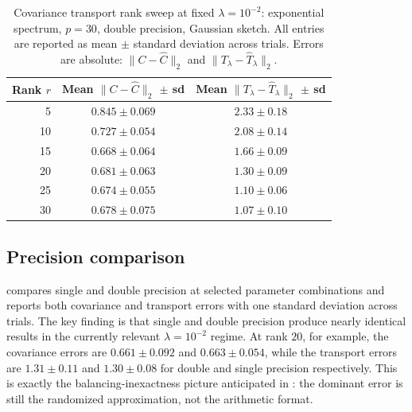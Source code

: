 \begin{table}[t]
	\centering
	\caption{Covariance transport rank sweep at fixed \(\lambda = 10^{-2}\): exponential spectrum, \(p=30\), double precision, Gaussian sketch. All entries are reported as mean \(\pm\) standard deviation across trials. Errors are absolute: \(\|C - \widehat C\|_2\) and \(\|T_\lambda - \widehat T_\lambda\|_2\).}
	\label{tab:ct_double}
	\begin{tabular}{rcc}
		\toprule
		Rank \(r\) & Mean \(\|C - \widehat C\|_2\) \(\pm\) sd & Mean \(\|T_\lambda - \widehat T_\lambda\|_2\) \(\pm\) sd \\
		\midrule
		5          & \(0.845 \pm 0.069\)                      & \(2.33 \pm 0.18\)                                        \\
		10         & \(0.727 \pm 0.054\)                      & \(2.08 \pm 0.14\)                                        \\
		15         & \(0.668 \pm 0.064\)                      & \(1.66 \pm 0.09\)                                        \\
		20         & \(0.681 \pm 0.063\)                      & \(1.30 \pm 0.09\)                                        \\
		25         & \(0.674 \pm 0.055\)                      & \(1.10 \pm 0.06\)                                        \\
		30         & \(0.678 \pm 0.075\)                      & \(1.07 \pm 0.10\)                                        \\
		\bottomrule
	\end{tabular}
\end{table}

\subsection{Precision comparison}

 compares single and double precision at selected parameter combinations and reports both covariance and transport errors with one standard deviation across trials. The key finding is that single and double precision produce nearly identical results in the currently relevant \(\lambda = 10^{-2}\) regime. At rank \(20\), for example, the covariance errors are \(0.661 \pm 0.092\) and \(0.663 \pm 0.054\), while the transport errors are \(1.31 \pm 0.11\) and \(1.30 \pm 0.08\) for double and single precision respectively. This is exactly the balancing-inexactness picture anticipated in : the dominant error is still the randomized approximation, not the arithmetic format.

